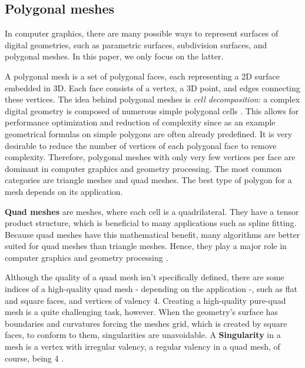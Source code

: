 \documentclass{ACGSeminar}
\begin{document}
\subsection{Polygonal meshes}
In computer graphics, there are many possible ways to represent surfaces of digital geometries, such as parametric surfaces, subdivision surfaces, and polygonal meshes. In this paper, we only focus on the latter.\bigskip

A polygonal mesh is a set of polygonal faces, each representing a 2D surface embedded in 3D. Each face consists of a vertex, a 3D point, and edges connecting these vertices. The idea behind polygonal meshes is \textit{cell decomposition}: a complex digital geometry is composed of numerous simple polygonal cells \cite{bommes2013quad}. This allows for performance optimization and reduction of complexity since as an example geometrical formulas on simple polygons are often already predefined. It is very desirable to reduce the number of vertices of each polygonal face to remove complexity. Therefore, polygonal meshes with only very few vertices per face are dominant in computer graphics and geometry processing. The most common categories are triangle meshes and quad meshes. The best type of polygon for a mesh depends on its application.\bigskip

\textbf{Quad meshes} are meshes, where each cell is a quadrilateral. They have a tensor product structure, which is beneficial to many applications such as spline fitting. Because quad meshes have this mathematical benefit, many algorithms are better suited for quad meshes than triangle meshes. Hence, they play a major role in computer graphics and geometry processing \cite{bommes2013quad, chen2019quadrilateral}.\bigskip

Although the quality of a quad mesh isn't specifically defined, there are some indices of a high-quality quad mesh - depending on the application -, such as flat and square faces, and vertices of valency 4. Creating a high-quality pure-quad mesh is a quite challenging task, however. When the geometry's surface has boundaries and curvatures forcing the meshes grid, which is created by square faces, to conform to them, singularities are unavoidable. A \textbf{Singularity} in a mesh is a vertex with irregular valency, a regular valency in a quad mesh, of course, being 4 \cite{fogg2017simple,fogg2018singularities}.
\end{document}

